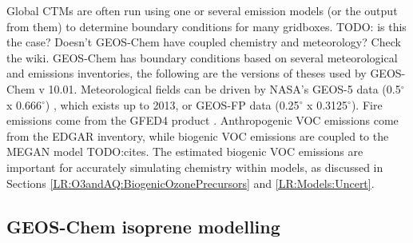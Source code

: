   Global CTMs are often run using one or several emission models (or the output from them) to determine boundary conditions for many gridboxes.
  TODO: is this the case? Doesn't GEOS-Chem have coupled chemistry and meteorology? Check the wiki.
  GEOS-Chem has boundary conditions based on several meteorological and emissions inventories, the following are the versions of theses used by GEOS-Chem v 10.01. 
  Meteorological fields can be driven by NASA's GEOS-5 data (0.5$^{\circ}$ x 0.666$^{\circ}$) \parencite{Chen2009}, which exists up to 2013, or GEOS-FP data (0.25$^{\circ}$ x 0.3125$^{\circ}$).
  Fire emissions come from the GFED4 product \parencite{Giglio2013}. 
  Anthropogenic VOC emissions come from the EDGAR inventory, while biogenic VOC emissions are coupled to the MEGAN model TODO:cites.
  The estimated biogenic VOC emissions are important for accurately simulating chemistry within models, as discussed in Sections \ref{LR:O3andAQ:BiogenicOzonePrecursors} and \ref{LR:Models:Uncert}.

  \subsection{GEOS-Chem isoprene modelling}
  \label{Model:GC:Isop}
